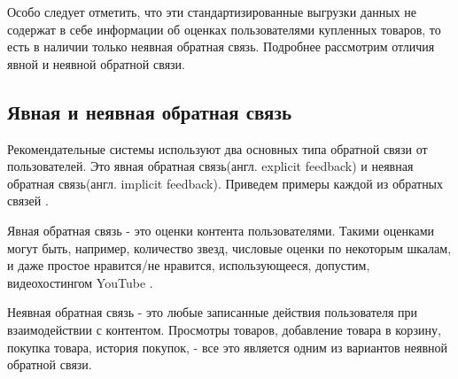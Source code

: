 \documentclass[14pt]{mmcs_article}
\begin{document}
Особо следует отметить, что эти стандартизированные выгрузки данных не содержат в себе информации об оценках пользователями купленных товаров, то есть в наличии только неявная обратная связь. Подробнее рассмотрим отличия явной и неявной обратной связи.

\subsection{Явная и неявная обратная связь}
Рекомендательные системы используют два основных типа обратной связи от пользователей. Это явная обратная связь(англ. explicit feedback) и неявная обратная связь(англ. implicit feedback). Приведем примеры каждой из обратных связей \cite{stud:kimfalk1}.


Явная обратная связь - это оценки контента пользователями. Такими оценками могут быть, например, количество звезд, числовые оценки по некоторым шкалам, и даже простое нравится/не нравится, использующееся, допустим, видеохостингом YouTube \cite{stud:kimfalk1}.

Неявная обратная связь - это любые записанные действия пользователя при взаимодействии с контентом. Просмотры товаров, добавление товара в корзину, покупка товара, история покупок, - все это является одним из вариантов неявной обратной связи. 
\end{document}

